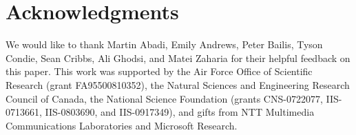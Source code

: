\section*{Acknowledgments}
We would like to thank Martin Abadi, Emily Andrews, Peter Bailis, Tyson Condie,
Sean Cribbs, Ali Ghodsi, and Matei Zaharia for their helpful feedback on this
paper.  This work was supported by the Air Force Office of Scientific Research
(grant FA95500810352), the Natural Sciences and Engineering Research Council of
Canada, the National Science Foundation (grants CNS-0722077, IIS-0713661,
IIS-0803690, and IIS-0917349), and gifts from NTT Multimedia Communications
Laboratories and Microsoft Research.

